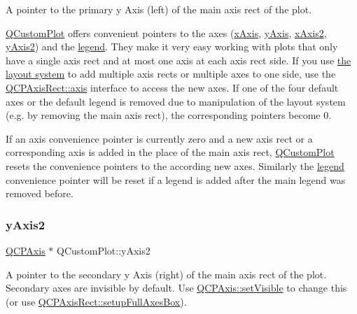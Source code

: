 A pointer to the primary y Axis (left) of the main axis rect of the plot.

\hyperlink{classQCustomPlot}{Q\+Custom\+Plot} offers convenient pointers to the axes (\hyperlink{classQCustomPlot_a9a79cd0158a4c7f30cbc702f0fd800e4}{x\+Axis}, \hyperlink{classQCustomPlot_af6fea5679725b152c14facd920b19367}{y\+Axis}, \hyperlink{classQCustomPlot_ada41599f22cad901c030f3dcbdd82fd9}{x\+Axis2}, \hyperlink{classQCustomPlot_af13fdc5bce7d0fabd640f13ba805c0b7}{y\+Axis2}) and the \hyperlink{classQCustomPlot_a4eadcd237dc6a09938b68b16877fa6af}{legend}. They make it very easy working with plots that only have a single axis rect and at most one axis at each axis rect side. If you use \hyperlink{}{the layout system} to add multiple axis rects or multiple axes to one side, use the \hyperlink{classQCPAxisRect_a583ae4f6d78b601b732183f6cabecbe1}{Q\+C\+P\+Axis\+Rect\+::axis} interface to access the new axes. If one of the four default axes or the default legend is removed due to manipulation of the layout system (e.\+g. by removing the main axis rect), the corresponding pointers become 0.

If an axis convenience pointer is currently zero and a new axis rect or a corresponding axis is added in the place of the main axis rect, \hyperlink{classQCustomPlot}{Q\+Custom\+Plot} resets the convenience pointers to the according new axes. Similarly the \hyperlink{classQCustomPlot_a4eadcd237dc6a09938b68b16877fa6af}{legend} convenience pointer will be reset if a legend is added after the main legend was removed before. \mbox{\label{classQCustomPlot_af13fdc5bce7d0fabd640f13ba805c0b7}} 
\subsubsection{\texorpdfstring{y\+Axis2}{yAxis2}}
{\footnotesize\ttfamily \hyperlink{classQCPAxis}{Q\+C\+P\+Axis} $\ast$ Q\+Custom\+Plot\+::y\+Axis2}

A pointer to the secondary y Axis (right) of the main axis rect of the plot. Secondary axes are invisible by default. Use \hyperlink{classQCPLayerable_a3bed99ddc396b48ce3ebfdc0418744f8}{Q\+C\+P\+Axis\+::set\+Visible} to change this (or use \hyperlink{classQCPAxisRect_a5fa906175447b14206954f77fc7f1ef4}{Q\+C\+P\+Axis\+Rect\+::setup\+Full\+Axes\+Box}).

